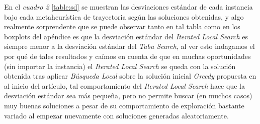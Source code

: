 \documentclass{ci5652}
\begin{document}
En el \textit{cuadro 2} \ref{table:sd} se muestran las desviaciones estándar de cada instancia bajo cada metaheurística de trayectoria según las soluciones obtenidas, y algo realmente sorprendente que se puede observar tanto en tal tabla como en los boxplots del apéndice es que la desviación estándar del \textit{Iterated Local Search} es siempre menor a la desviación estándar del \textit{Tabu Search}, al ver esto indagamos el por qué de tales resultados y caímos en cuenta de que en muchas oportunidades (sin importar la instancia) el \textit{Iterated Local Search} se queda con la solución obtenida tras aplicar \textit{Búsqueda Local} sobre la solución inicial \textit{Greedy} propuesta en al inicio del artículo, tal comportamiento del \textit{Iterated Local Search} hace que la desviación estándar sea más pequeña, pero no permite buscar (en muchos casos) muy buenas soluciones a pesar de su comportamiento de exploración bastante variado al empezar nuevamente con soluciones generadas aleatoriamente.
\end{document}
